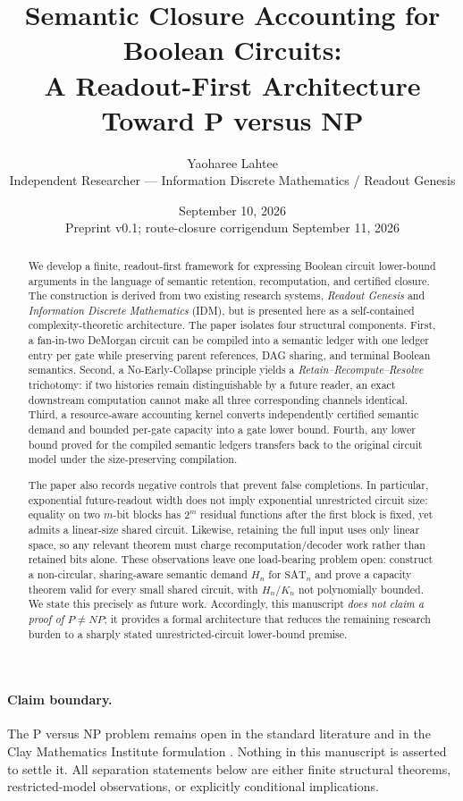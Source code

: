\documentclass[11pt]{article}
\title{\textbf{Semantic Closure Accounting for Boolean Circuits:}\\
A Readout-First Architecture Toward P versus NP}
\author{Yaoharee Lahtee\\
\small Independent Researcher --- Information Discrete Mathematics / Readout Genesis}
\date{September 10, 2026\\\small Preprint v0.1; route-closure corrigendum September 11, 2026}
\newcommand{\SAT}{\mathrm{SAT}}
\begin{document}
\maketitle

\begin{abstract}
We develop a finite, readout-first framework for expressing Boolean circuit lower-bound arguments in the language of semantic retention, recomputation, and certified closure. The construction is derived from two existing research systems, \emph{Readout Genesis} and \emph{Information Discrete Mathematics} (IDM), but is presented here as a self-contained complexity-theoretic architecture. The paper isolates four structural components. First, a fan-in-two DeMorgan circuit can be compiled into a semantic ledger with one ledger entry per gate while preserving parent references, DAG sharing, and terminal Boolean semantics. Second, a No-Early-Collapse principle yields a \emph{Retain--Recompute--Resolve} trichotomy: if two histories remain distinguishable by a future reader, an exact downstream computation cannot make all three corresponding channels identical. Third, a resource-aware accounting kernel converts independently certified semantic demand and bounded per-gate capacity into a gate lower bound. Fourth, any lower bound proved for the compiled semantic ledgers transfers back to the original circuit model under the size-preserving compilation.

The paper also records negative controls that prevent false completions. In particular, exponential future-readout width does not imply exponential unrestricted circuit size: equality on two $m$-bit blocks has $2^m$ residual functions after the first block is fixed, yet admits a linear-size shared circuit. Likewise, retaining the full input uses only linear space, so any relevant theorem must charge recomputation/decoder work rather than retained bits alone. These observations leave one load-bearing problem open: construct a non-circular, sharing-aware semantic demand $H_n$ for $\SAT_n$ and prove a capacity theorem valid for every small shared circuit, with $H_n/K_n$ not polynomially bounded. We state this precisely as future work. Accordingly, this manuscript \emph{does not claim a proof of $P\neq NP$}; it provides a formal architecture that reduces the remaining research burden to a sharply stated unrestricted-circuit lower-bound premise.
\end{abstract}

\paragraph{Claim boundary.}
The P versus NP problem remains open in the standard literature and in the Clay Mathematics Institute formulation \cite{CookCMI,CMIPvsNP}. Nothing in this manuscript is asserted to settle it. All separation statements below are either finite structural theorems, restricted-model observations, or explicitly conditional implications.
\end{document}
